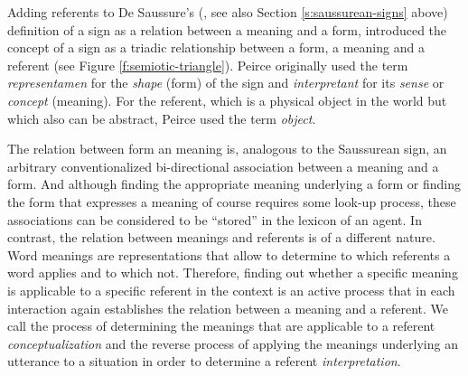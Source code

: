 Adding referents to De Saussure's (\citeyear{saussure67cours}, see
also Section \ref{s:saussurean-signs} above) definition of a sign as a
relation between a meaning and a form, \cite{peirce31collected}
introduced the concept of a sign as a triadic relationship between a
form, a meaning and a referent (see Figure
\ref{f:semiotic-triangle}). Peirce originally used the term
\emph{representamen} for the \emph{shape} (form) of the sign and
\emph{interpretant} for its \emph{sense} or \emph{concept} (meaning).
For the referent, which is a physical object in the world but which
also can be abstract, Peirce used the term \emph{object}. 


The relation between form an meaning is, analogous to the Saussurean
sign, an arbitrary conventionalized bi-directional association between
a meaning and a form. And although finding the appropriate meaning
underlying a form or finding the form that expresses a meaning of
course requires some look-up process, these associations can be
considered to be ``stored'' in the lexicon of an agent. In contrast,
the relation between meanings and referents is of a different
nature. Word meanings are representations that allow to determine to
which referents a word applies and to which not. Therefore, finding
out whether a specific meaning is applicable to a specific referent in
the context is an active process that in each interaction again
establishes the relation between a meaning and a referent. We call the
process of determining the meanings that are applicable to a referent
\emph{conceptualization} and the reverse process of applying the
meanings underlying an utterance to a situation in order to determine
a referent \emph{interpretation}.


